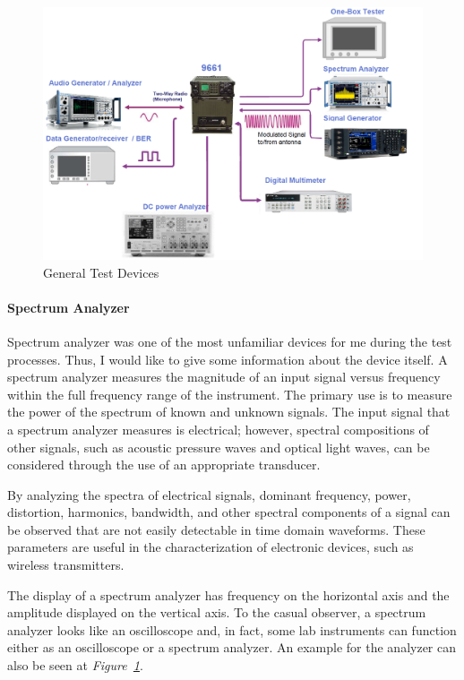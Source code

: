 \begin{figure}[H]
	\center
	\setlength{\unitlength}{\textwidth} 
	\includegraphics[width=0.75\unitlength]{components}
	\caption{\label{fig:components}General Test Devices \cite{9661,specan,keysight,mult}}
\end{figure}

\paragraph{Spectrum Analyzer} 
\- \indent
	Spectrum analyzer was one of the most unfamiliar devices for me during the test processes. Thus, I would like to give some information about the device itself. A spectrum analyzer measures the magnitude of an input signal versus frequency within the full frequency range of the instrument. The primary use is to measure the power of the spectrum of known and unknown signals. The input signal that a spectrum analyzer measures is electrical; however, spectral compositions of other signals, such as acoustic pressure waves and optical light waves, can be considered through the use of an appropriate transducer. 

	By analyzing the spectra of electrical signals, dominant frequency, power, distortion, harmonics, bandwidth, and other spectral components of a signal can be observed that are not easily detectable in time domain waveforms. These parameters are useful in the characterization of electronic devices, such as wireless transmitters.

	The display of a spectrum analyzer has frequency on the horizontal axis and the amplitude displayed on the vertical axis. To the casual observer, a spectrum analyzer looks like an oscilloscope and, in fact, some lab instruments can function either as an oscilloscope or a spectrum analyzer. An example for the analyzer can also be seen at \textit{Figure~\ref{fig:components}}.

